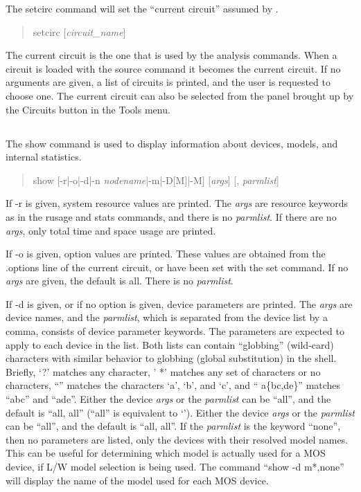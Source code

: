 
The {\cb setcirc} command will set the ``current circuit'' assumed
by {\WRspice}.
\begin{quote}\vt
setcirc [{\it circuit\_name\/}]
\end{quote}
The current circuit is the one that is used by the analysis commands. 
When a circuit is loaded with the {\cb source} command it becomes the
current circuit.  If no arguments are given, a list of circuits is
printed, and the user is requested to choose one.  The current circuit
can also be selected from the panel brought up by the {\cb Circuits}
button in the {\cb Tools} menu.
 
\subsection{}


The {\cb show} command is used to display information about devices,
models, and internal statistics.
\begin{quote}\vt
show [-r|-o|-d|-n {\it nodename}|-m|-D[M]|-M] [{\it args\/}]
  [, {\it parmlist\/}]
\end{quote}
If {\vt -r} is given, system resource values are printed.  The {\it
args} are resource keywords as in the {\cb rusage} and {\cb
stats} commands, and there is no {\it parmlist}.  If there are no {\it
args}, only total time and space usage are printed.

If {\vt -o} is given, {\WRspice} option values are printed.  These
values are obtained from the {\vt .options} line of the current
circuit, or have been set with the {\cb set} command.  If no {\it
args} are given, the default is {\vt all}.  There is no {\it
parmlist}.

If {\vt -d} is given, or if no option is given, device parameters are
printed.  The {\it args} are device names, and the {\it parmlist},
which is separated from the device list by a comma, consists of device
parameter keywords.  The parameters are expected to apply to each
device in the list.  Both lists can contain ``globbing'' (wild-card)
characters with similar behavior to globbing (global substitution) in
the {\WRspice} shell.  Briefly, `{\vt ?}' matches any character, '{\vt
*}' matches any set of characters or no characters, ``{\vt [abc]}''
matches the characters `{\vt a}', `{\vt b}', and `{\vt c}', and ``{\vt
a}\{{\vt bc,de}\}'' matches ``{\vt abc}'' and ``{\vt ade}''.  Either
the device {\it args} or the {\it parmlist} can be ``{\vt all}'',
and the default is ``{\vt all, all}'' (``{\vt all}'' is
equivalent to `{\vt *}').  Either the device {\it args} or the {\it
parmlist} can be ``{\vt all}'', and the default is ``{\vt all, all}''. 
If the {\it parmlist} is the keyword ``{\vt none}'', then no
parameters are listed, only the devices with their resolved model
names.  This can be useful for determining which model is actually
used for a MOS device, if L/W model selection is being used.  The
command ``{\vt show -d m*,none}'' will display the name of the model
used for each MOS device.

